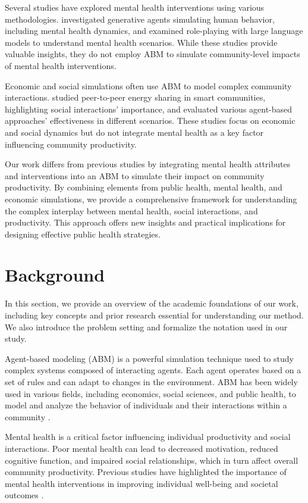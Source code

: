 \documentclass{article} %
\begin{document}
Several studies have explored mental health interventions using various methodologies. \citet{park2023generative} investigated generative agents simulating human behavior, including mental health dynamics, and \citet{shanahan2023role} examined role-playing with large language models to understand mental health scenarios. While these studies provide valuable insights, they do not employ ABM to simulate community-level impacts of mental health interventions.

Economic and social simulations often use ABM to model complex community interactions. \citet{zhou2023peer} studied peer-to-peer energy sharing in smart communities, highlighting social interactions' importance, and \citet{liu2023agentbench} evaluated various agent-based approaches' effectiveness in different scenarios. These studies focus on economic and social dynamics but do not integrate mental health as a key factor influencing community productivity.

Our work differs from previous studies by integrating mental health attributes and interventions into an ABM to simulate their impact on community productivity. By combining elements from public health, mental health, and economic simulations, we provide a comprehensive framework for understanding the complex interplay between mental health, social interactions, and productivity. This approach offers new insights and practical implications for designing effective public health strategies.

\section{Background}
\label{sec:background}

In this section, we provide an overview of the academic foundations of our work, including key concepts and prior research essential for understanding our method. We also introduce the problem setting and formalize the notation used in our study.

Agent-based modeling (ABM) is a powerful simulation technique used to study complex systems composed of interacting agents. Each agent operates based on a set of rules and can adapt to changes in the environment. ABM has been widely used in various fields, including economics, social sciences, and public health, to model and analyze the behavior of individuals and their interactions within a community \citep{poledna2023economic, west2023agent}.

Mental health is a critical factor influencing individual productivity and social interactions. Poor mental health can lead to decreased motivation, reduced cognitive function, and impaired social relationships, which in turn affect overall community productivity. Previous studies have highlighted the importance of mental health interventions in improving individual well-being and societal outcomes \citep{park2023generative, shanahan2023role}.
\end{document}
